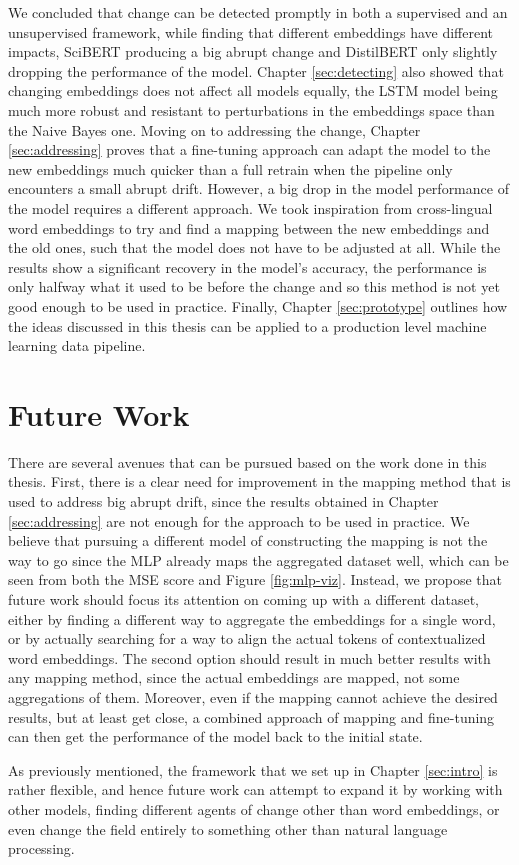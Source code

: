 \documentclass[12pt]{extreport}
\begin{document}
We concluded that change can be detected promptly in both a supervised and an unsupervised framework, while finding that different embeddings have different impacts, SciBERT producing a big abrupt change and DistilBERT only slightly dropping the performance of the model. Chapter \ref{sec:detecting} also showed that changing embeddings does not affect all models equally, the LSTM model being much more robust and resistant to perturbations in the embeddings space than the Naive Bayes one. Moving on to addressing the change, Chapter \ref{sec:addressing} proves that a fine-tuning approach can adapt the model to the new embeddings much quicker than a full retrain when the pipeline only encounters a small abrupt drift. However, a big drop in the model performance of the model requires a different approach. We took inspiration from cross-lingual word embeddings to try and find a mapping between the new embeddings and the old ones, such that the model does not have to be adjusted at all. While the results show a significant recovery in the model's accuracy, the performance is only halfway what it used to be before the change and so this method is not yet good enough to be used in practice. Finally, Chapter \ref{sec:prototype} outlines how the ideas discussed in this thesis can be applied to a production level machine learning data pipeline.

\section{Future Work}

There are several avenues that can be pursued based on the work done in this thesis. First, there is a clear need for improvement in the mapping method that is used to address big abrupt drift, since the results obtained in Chapter \ref{sec:addressing} are not enough for the approach to be used in practice. We believe that pursuing a different model of constructing the mapping is not the way to go since the MLP already maps the aggregated dataset well, which can be seen from both the MSE score and Figure \ref{fig:mlp-viz}. Instead, we propose that future work should focus its attention on coming up with a different dataset, either by finding a different way to aggregate the embeddings for a single word, or by actually searching for a way to align the actual tokens of contextualized word embeddings. The second option should result in much better results with any mapping method, since the actual embeddings are mapped, not some aggregations of them. Moreover, even if the mapping cannot achieve the desired results, but at least get close, a combined approach of mapping and fine-tuning can then get the performance of the model back to the initial state.

As previously mentioned, the framework that we set up in Chapter \ref{sec:intro} is rather flexible, and hence future work can attempt to expand it by working with other models, finding different agents of change other than word embeddings, or even change the field entirely to something other than natural language processing.



\end{document}

